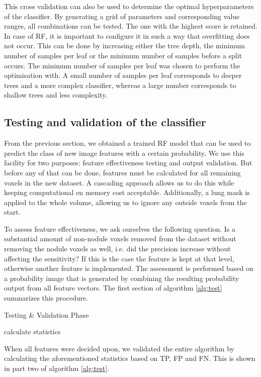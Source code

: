 This cross validation can also be used to determine the optimal hyperparameters
of the classifier. By generating a grid of parameters and corresponding value
ranges, all combinations can be tested. The one with the highest score is
retained. In case of RF, it is important to configure it in such a way that
overfitting does not occur. This can be done by increasing either the tree
depth, the minimum number of samples per leaf or the minimum number of samples
before a split occurs. The minimum number of samples per leaf was chosen to
perform the optimisation with. A small number of samples per leaf corresponds to
deeper trees and a more complex classifier, whereas a large number corresponds
to shallow trees and less complexity.

\subsection{Testing and validation of the classifier}
From the previous section, we obtained a trained RF model that can be used to
predict the class of new image features with a certain probability. We use this
facility for two purposes: feature effectiveness testing and output validation.
But before any of that can be done, features must be calculated for all
remaining voxels in the new dataset. A cascading approach allows us to do this
while keeping computational en memory cost acceptable. Additionally, a lung mask
is applied to the whole volume, allowing us to ignore any outside voxels from
the start.

To assess feature effectiveness, we ask ourselves the following question. Is a
substantial amount of non-nodule voxels removed from the dataset without
removing the nodule voxels as well, i.e. did the precision increase without
affecting the sensitivity? If this is the case the feature is kept at that
level, otherwise another feature is implemented. The assessment is performed
based on a probability image that is generated by combining the resulting
probability output from all feature vectors. The first section of algorithm
\ref{alg:test} summarizes this procedure.

\begin{algorithm}[ht]
	\DontPrintSemicolon
	\caption{Testing \& Validation Phase\label{alg:test}}
	calculate statistics
\end{algorithm}

When all features were decided upon, we validated the entire algorithm by 
calculating the aforementioned statistics based on TP, FP and FN. This is 
shown in part two of algorithm \ref{alg:test}.